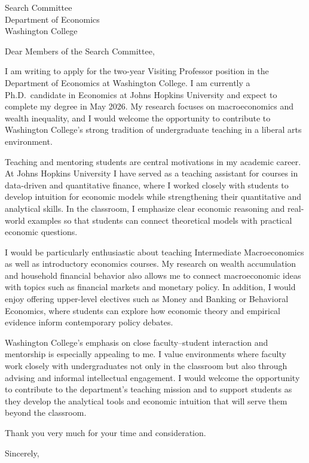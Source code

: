 \documentclass[11pt]{letter}
\begin{document}
\begin{letter}{Search Committee \\
Department of Economics \\
Washington College}

\opening{Dear Members of the Search Committee,}

I am writing to apply for the two-year Visiting Professor position in the Department of Economics at Washington College. I am currently a Ph.D.\ candidate in Economics at Johns Hopkins University and expect to complete my degree in May 2026. My research focuses on macroeconomics and wealth inequality, and I would welcome the opportunity to contribute to Washington College’s strong tradition of undergraduate teaching in a liberal arts environment.

Teaching and mentoring students are central motivations in my academic career. At Johns Hopkins University I have served as a teaching assistant for courses in data-driven and quantitative finance, where I worked closely with students to develop intuition for economic models while strengthening their quantitative and analytical skills. In the classroom, I emphasize clear economic reasoning and real-world examples so that students can connect theoretical models with practical economic questions.

I would be particularly enthusiastic about teaching Intermediate Macroeconomics as well as introductory economics courses. My research on wealth accumulation and household financial behavior also allows me to connect macroeconomic ideas with topics such as financial markets and monetary policy. In addition, I would enjoy offering upper-level electives such as Money and Banking or Behavioral Economics, where students can explore how economic theory and empirical evidence inform contemporary policy debates.

Washington College’s emphasis on close faculty–student interaction and mentorship is especially appealing to me. I value environments where faculty work closely with undergraduates not only in the classroom but also through advising and informal intellectual engagement. I would welcome the opportunity to contribute to the department’s teaching mission and to support students as they develop the analytical tools and economic intuition that will serve them beyond the classroom.

Thank you very much for your time and consideration.

\closing{Sincerely,}

\end{letter}
\end{document}
